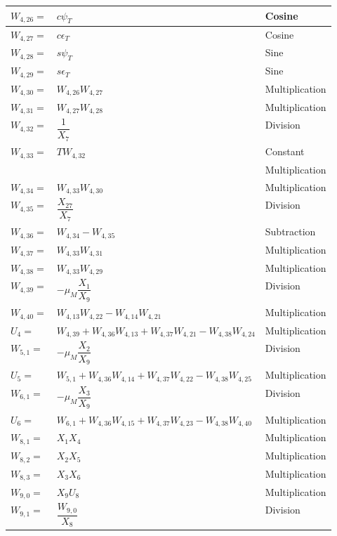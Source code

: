 \begin{longtable}{|p{1.5cm}|l|p{2cm}|}
$W_{4,26}=$ & $ c\psi_{T} $ & Cosine \\ \hline
$W_{4,27}=$ & $ c\epsilon_{T} $ & Cosine \\ \hline
$W_{4,28}=$ & $ s\psi_{T} $ & Sine \\ \hline
$W_{4,29}=$ & $ s\epsilon_{T} $ & Sine \\ \hline
$W_{4,30}=$ & $ W_{4,26}W_{4,27} $ & Multiplication \\ \hline
$W_{4,31}=$ & $ W_{4,27}W_{4,28} $ & Multiplication \\ \hline
$W_{4,32}=$ & $ \dfrac{1}{X_{7}} $ & Division \\ \hline
$W_{4,33}=$ & $ T W_{4,32} $ & Constant  \\ 
& & Multiplication \\ \hline
$W_{4,34}=$ & $ W_{4,33}W_{4,30} $ & Multiplication \\ \hline
$W_{4,35}=$ & $ \dfrac{X_{27}}{X_{7}} $ & Division \\ \hline
$W_{4,36}=$ & $ W_{4,34}-W_{4,35} $ & Subtraction \\ \hline
$W_{4,37}=$ & $ W_{4,33}W_{4,31} $ & Multiplication \\ \hline
$W_{4,38}=$ & $ W_{4,33}W_{4,29} $ & Multiplication \\ \hline
$W_{4,39}=$ & $ -\mu_{M}\dfrac{X_{1}}{X_{9}} $ & Division \\ \hline
$W_{4,40}=$ & $ W_{4,13}W_{4,22}-W_{4,14}W_{4,21} $ & Multiplication \\ \hline
$U_{4}=$ & $ W_{4,39}+W_{4,36}W_{4,13}+W_{4,37}W_{4,21}-W_{4,38}W_{4,24} $ & Multiplication \\ \hline
$W_{5,1}=$ & $-\mu_{M}\dfrac{X_{2}}{X_{9}}  $ & Division \\ \hline
$U_{5}=$ & $ W_{5,1}+W_{4,36}W_{4,14}+W_{4,37}W_{4,22}-W_{4,38}W_{4,25} $ & Multiplication \\ \hline
$W_{6,1}=$ & $ -\mu_{M}\dfrac{X_{3}}{X_{9}} $ & Division \\ \hline
$U_{6}=$ & $W_{6,1}+W_{4,36}W_{4,15}+W_{4,37}W_{4,23}-W_{4,38}W_{4,40}  $ & Multiplication \\ \hline
$W_{8,1}=$ & $ X_{1}X_{4} $ & Multiplication \\ \hline
$W_{8,2}=$ & $ X_{2}X_{5} $ & Multiplication \\ \hline
$W_{8,3}=$ & $ X_{3}X_{6} $ & Multiplication \\ \hline
$W_{9,0}=$ & $ X_{9}U_{8} $ & Multiplication \\ \hline
$W_{9,1}=$ & $ \dfrac{W_{9,0}}{X_{8}} $ & Division \\ \hline

\end{longtable}
